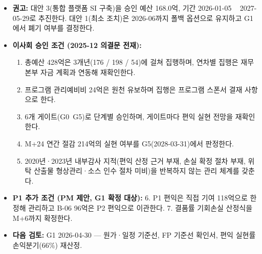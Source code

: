 \documentclass[10pt,a4paper]{article}
\begin{document}
\begin{fieldbox}
\ifwbblank
{} 
 \par
{}         
 
 
\else
\begin{itemize}
\item \textbf{권고:} 대안 3(통합 플랫폼 SI 구축)을 승인 예산 168.0억, 기간 2026-01-05 ~ 2027-05-29로 추진한다. 대안 1(최소 조치)은 2026-06까지 폴백 옵션으로 유지하고 G1에서 폐기 여부를 결정한다.
\item \textbf{이사회 승인 조건 (2025-12 의결문 전재):}
  \begin{enumerate}[leftmargin=6mm]
  \item 총예산 428억은 3개년(176 / 198 / 54)에 걸쳐 집행하며, 연차별 집행은 재무본부 자금 계획과 연동해 재확인한다.
  \item 프로그램 관리예비비 24억은 원천 유보하며 집행은 프로그램 스폰서 결재 사항으로 한다.
  \item 6개 게이트(G0~G5)로 단계별 승인하며, 게이트마다 편익 실현 전망을 재확인한다.
  \item M+24 연간 절감 214억의 실현 여부를 G5(2028-03-31)에서 판정한다.
  \item 2020년·2023년 내부감사 지적(편익 산정 근거 부재, 손실 확정 절차 부재, 위탁 산출물 형상관리·소스 인수 절차 미비)을 반복하지 않는 관리 체계를 갖춘다.
  \end{enumerate}
\item \textbf{P1 추가 조건 (PM 제안, G1 확정 대상):} 6. P1 편익은 직접 기여 118억으로 한정해 관리하고 B-06 96억은 P2 편익으로 이관한다. 7. 결품률 기회손실 산정식을 M+6까지 확정한다.
\item \textbf{다음 검토:} G1 2026-04-30 — 원가·일정 기준선, FP 기준선 확인서, 편익 실현률 손익분기(66\%) 재산정.
\end{itemize}
\fi
\end{fieldbox}
\end{document}
